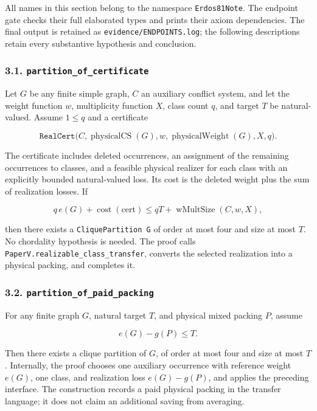 \documentclass[english,11pt,a4paper]{article}
\begin{document}
All names in this section belong to the namespace \nolinkurl{Erdos81Note}.
The endpoint gate checks their full elaborated types and prints their
axiom dependencies. The final output is retained as
\nolinkurl{evidence/ENDPOINTS.log}; the following descriptions retain every
substantive hypothesis and conclusion.

\subsubsection{\texorpdfstring{3.1.
\nolinkurl{partition_of_certificate}}{3.1. partition\_of\_certificate}}\label{partition_of_certificate}

Let \(G\) be any finite simple graph, \(C\) an auxiliary conflict
system, and let the weight function \(w\), multiplicity function \(X\),
class count \(q\), and target \(T\) be natural-valued. Assume \(1\le q\)
and a certificate

\[
\texttt{RealCert}\bigl(C,\operatorname{physicalCS}(G),
w,\operatorname{physicalWeight}(G),X,q\bigr).
\]

The certificate includes deleted occurrences, an assignment of the
remaining occurrences to classes, and a feasible physical realizer for
each class with an explicitly bounded natural-valued loss. Its cost is
the deleted weight plus the sum of realization losses. If

\[
q\,e(G)+\operatorname{cost}(\mathrm{cert})
\le qT+\operatorname{wMultSize}(C,w,X),
\]

then there exists a \texttt{CliquePartition\ G} of order at most four
and size at most \(T\). No chordality hypothesis is needed. The proof
calls \nolinkurl{PaperV.realizable_class_transfer}, converts the selected
realization into a physical packing, and completes it.

\subsubsection{\texorpdfstring{3.2.
\nolinkurl{partition_of_paid_packing}}{3.2. partition\_of\_paid\_packing}}\label{partition_of_paid_packing}

For any finite graph \(G\), natural target \(T\), and physical mixed
packing \(P\), assume

\[
e(G)-g(P)\le T.
\]

Then there exists a clique partition of \(G\), of order at most four and
size at most \(T\). Internally, the proof chooses one auxiliary
occurrence with reference weight \(e(G)\), one class, and realization
loss \(e(G)-g(P)\), and applies the preceding interface. The
construction records a paid physical packing in the transfer language;
it does not claim an additional saving from averaging.
\end{document}
